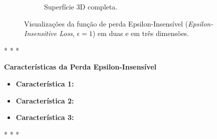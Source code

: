 \begin{figure}[h!]
\begin{subfigure}[b]{0.48\textwidth}
        \caption{Superfície 3D completa.} %
        \label{fig:epsilon-3d}
    \end{subfigure}

    \caption{Visualizações da função de perda Epsilon-Insensível (\textit{Epsilon-Insensitive Loss}, $\epsilon=1$) em duas e em três dimensões.}
    \label{fig:epsilon-insensitive-loss} %
\end{figure}

\medskip
\begin{center}
 * * *
\end{center}
\medskip

\textbf{Características da Perda Epsilon-Insensível}
\vspace{1em}

\begin{itemize}
    \item \textbf{Característica 1:}
    \item \textbf{Característica 2:}
    \item \textbf{Característica 3:}
\end{itemize}

\medskip
\begin{center}
 * * *
\end{center}
\medskip

